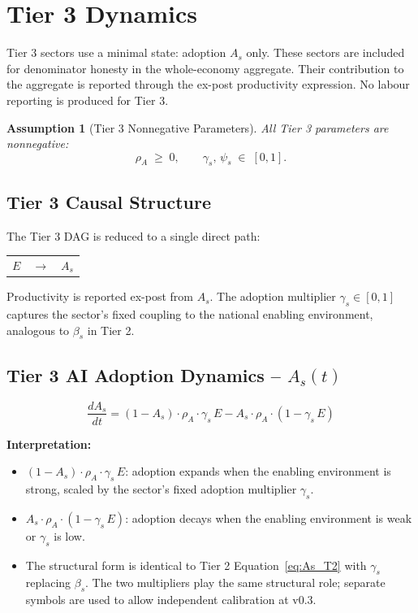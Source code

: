 \documentclass[11pt,a4paper]{article}
\newtheorem{assumption}{Assumption}
\begin{document}
\section{Tier 3 Dynamics}
\label{sec:tier3}

Tier 3 sectors use a minimal state: adoption $A_s$ only. These sectors are included for denominator honesty in the whole-economy aggregate. Their contribution to the aggregate is reported through the ex-post productivity expression. No labour reporting is produced for Tier 3.

\begin{assumption}[Tier 3 Nonnegative Parameters]
All Tier 3 parameters are nonnegative:
\[
\rho_A \;\geq\; 0, \qquad \gamma_s,\, \psi_s \;\in\; [0,1].
\]
\end{assumption}

\subsection{Tier 3 Causal Structure}

The Tier 3 DAG is reduced to a single direct path:

\begin{center}
\begin{tabular}{ccc}
$E$ & $\rightarrow$ & $A_s$ \\
\end{tabular}
\end{center}

Productivity is reported ex-post from $A_s$. The adoption multiplier $\gamma_s \in [0,1]$ captures the sector's fixed coupling to the national enabling environment, analogous to $\beta_s$ in Tier 2.

\subsection{Tier 3 AI Adoption Dynamics -- \texorpdfstring{$A_s(t)$}{As(t)}}

\begin{equation}
\boxed{
\frac{dA_s}{dt}
= (1 - A_s)\cdot\rho_A\cdot\gamma_s\, E
- A_s\cdot\rho_A\cdot(1 - \gamma_s\, E)
}
\label{eq:As_T3}
\end{equation}

\textbf{Interpretation:}
\begin{itemize}
  \item $(1 - A_s)\cdot\rho_A\cdot\gamma_s\, E$: adoption expands when the enabling environment is strong, scaled by the sector's fixed adoption multiplier $\gamma_s$.
  \item $A_s\cdot\rho_A\cdot(1 - \gamma_s\, E)$: adoption decays when the enabling environment is weak or $\gamma_s$ is low.
  \item The structural form is identical to Tier 2 Equation~\eqref{eq:As_T2} with $\gamma_s$ replacing $\beta_s$. The two multipliers play the same structural role; separate symbols are used to allow independent calibration at v0.3.
\end{itemize}
\end{document}
